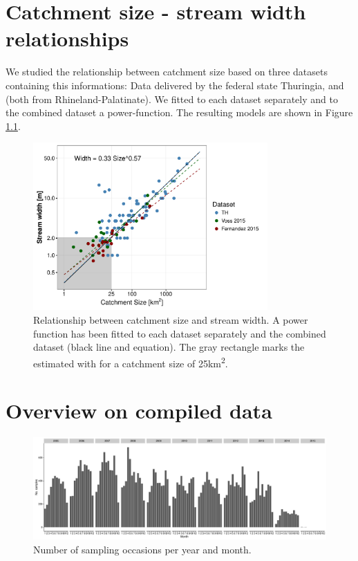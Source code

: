 \documentclass[pdftex,a4paper]{scrreprt}
\begin{document}
\chapter{Catchment size - stream width relationships}
We studied the relationship between catchment size based on three datasets containing this informations:
Data delivered by the federal state Thuringia, \citet{vos_organic_2015} and \citet{fernandez_effects_2015} (both from Rhineland-Palatinate).
We fitted to each dataset separately and to the combined dataset a power-function.
The resulting models are shown in Figure \ref{fig:size_width}. 

\begin{figure}[h]
	\centering
	\includegraphics[width = 0.8\textwidth]{width_size}
	\caption[Relationship between catchment size and stream width.]{Relationship between catchment size and stream width. A power function has been fitted to each dataset separately and the combined dataset (black line and equation). The gray rectangle marks the estimated with for a catchment size of 25km\textsuperscript{2}.}
	\label{fig:size_width}
\end{figure}



\chapter{Overview on compiled data}


\begin{figure}[h]
	\centering
	\includegraphics[width = \textwidth]{temporal}
	\caption{Number of sampling occasions per year and month.}
	\label{fig:temporal}
\end{figure}
\end{document}
